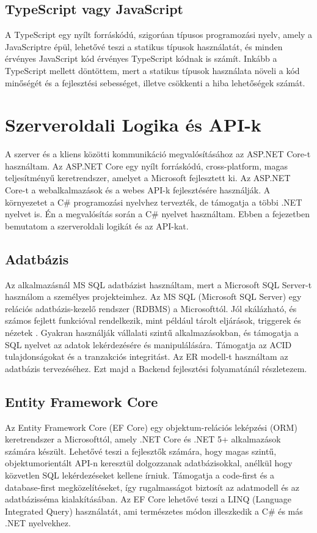 \subsection{TypeScript vagy JavaScript}
A TypeScript egy nyílt forráskódú, szigorúan típusos programozási nyelv,
amely a JavaScriptre épül, lehetővé teszi a statikus típusok használatát,
és minden érvényes JavaScript kód érvényes TypeScript kódnak is számít.
Inkább a TypeScript mellett döntöttem, mert a statikus típusok használata
növeli a kód minőségét és a fejlesztési sebességet, illetve csökkenti a hiba lehetőségek számát.

\section{Szerveroldali Logika és API-k}
A szerver és a kliens közötti kommunikáció megvalósításához az ASP.NET Core-t használtam.
Az ASP.NET Core egy nyílt forráskódú, cross-platform, magas teljesítményű keretrendszer,
amelyet a Microsoft fejlesztett ki.
Az ASP.NET Core-t a webalkalmazások és a webes API-k fejlesztésére használják.
A környezetet a C\# programozási nyelvhez tervezték, de támogatja a többi .NET nyelvet is.
Én a megvalósítás során a C\# nyelvet használtam.
Ebben a fejezetben bemutatom a szerveroldali logikát és az API-kat.

\subsection{Adatbázis}
Az alkalmazásnál MS SQL adatbázist használtam, mert a Microsoft SQL Server-t használom a személyes projekteimhez.
Az MS SQL (Microsoft SQL Server) egy relációs adatbázis-kezelő rendszer (RDBMS) a Microsofttól. Jól skálázható, és számos fejlett funkcióval rendelkezik,
mint például tárolt eljárások,
triggerek és nézetek
. Gyakran használják vállalati szintű alkalmazásokban,
és támogatja a SQL nyelvet az adatok lekérdezésére és manipulálására.
Támogatja az ACID tulajdonságokat és a tranzakciós integritást.
Az ER modell-t használtam az adatbázis tervezéséhez.
Ezt majd a Backend fejlesztési folyamatánál részletezem.

\subsection{Entity Framework Core}
Az Entity Framework Core \cite[]{efcore} (EF Core) egy objektum-relációs leképzési (ORM) keretrendszer a Microsofttól,
amely .NET Core és .NET 5+ alkalmazások számára készült.
Lehetővé teszi a fejlesztők számára, hogy magas szintű,
objektumorientált API-n keresztül dolgozzanak adatbázisokkal,
anélkül hogy közvetlen SQL lekérdezéseket kellene írniuk.
Támogatja a code-first és a database-first megközelítéseket,
így rugalmasságot biztosít az adatmodell és az adatbázisséma kialakításában. Az EF Core lehetővé teszi a LINQ (Language Integrated Query) használatát,
ami természetes módon illeszkedik a C\# és más .NET nyelvekhez.

